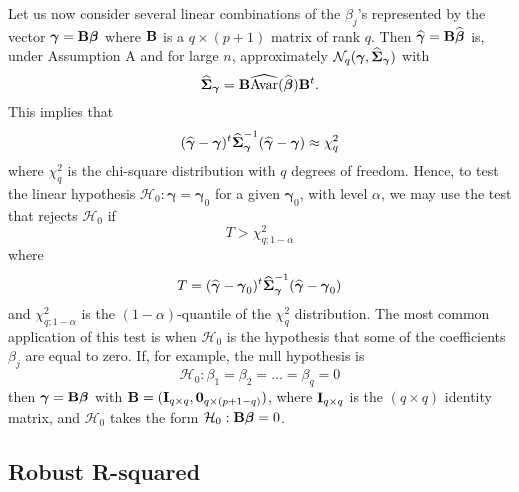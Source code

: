 Let us now consider several linear combinations of the $\beta_{j}$'s
represented by the vector $\boldsymbol{\gamma} = \mathbf B\boldsymbol\beta$
where $\mathbf B$ is a $q \times (p+1)$ matrix of rank $q$. Then
$\widehat{\boldsymbol{\gamma}} = \mathbf B\widehat{\boldsymbol\beta}$ is, under
Assumption A and for large $n$, approximately
$\mathcal{N}_q(\boldsymbol{\gamma},
\widehat{\boldsymbol\Sigma}_{\boldsymbol\gamma})$ with
\[
    \widehat{\boldsymbol\Sigma}_{\boldsymbol\gamma} 
    = \mathbf B\widehat{\mathrm{Avar}}(\widehat{\boldsymbol\beta})\mathbf B^t.
\]
This implies that
\[
    (\widehat{\boldsymbol\gamma} - \boldsymbol\gamma)^t 
    \widehat{\boldsymbol\Sigma}_{\boldsymbol\gamma}^{-1} 
    (\widehat{\boldsymbol\gamma} - \boldsymbol\gamma)  \approx \chi_q^2
\]
where $\chi_q^2$ is the chi-square distribution with $q$ degrees of freedom.
Hence, to test the linear hypothesis $\mathcal{H}_0: \boldsymbol\gamma =
\boldsymbol\gamma_0$ for a given $\boldsymbol\gamma_0$, with level $\alpha$, we
may use the test that rejects $\mathcal{H}_0$ if
\[
    T > \chi_{q;1-\alpha}^2
\]
where
\[
    T = (\widehat{\boldsymbol\gamma} - \boldsymbol\gamma_0)^t
    \widehat{\boldsymbol\Sigma}_{\boldsymbol\gamma}^{-1}
    (\widehat{\boldsymbol\gamma} - \boldsymbol\gamma_0)
\]
and $\chi_{q;1-\alpha}^2$ is the $(1-\alpha)$-quantile of the $\chi_q^2$
distribution. The most common application of this test is when $\mathcal{H}_0$
is the hypothesis that some of the coefficients $\beta_j$ are equal to zero.
If, for example, the null hypothesis is
\[
    \mathcal{H}_0: \beta_1 = \beta_2 = \dots = \beta_q = 0
\]
then $\boldsymbol\gamma = \mathbf B\boldsymbol\beta$ with $\mathbf B =
(\mathbf I_{q\times q}, \mathbf 0_{q\times(p+1-q)})$, where $\mathbf I_{q\times
q}$ is the $(q\times q)$ identity matrix, and $\mathcal{H}_0$ takes the form
$\mathcal{H}_0: \mathbf B\boldsymbol\beta = 0$.

\subsection{Robust R-squared}

